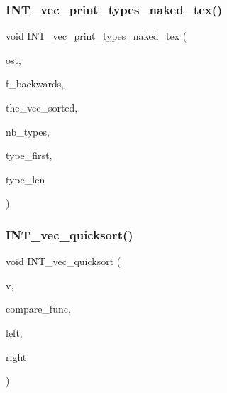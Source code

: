 \mbox{\label{sorting_8_c_a479b7e8ee55628b5b53ac38bf6532476}} 
\subsubsection{\texorpdfstring{I\+N\+T\+\_\+vec\+\_\+print\+\_\+types\+\_\+naked\+\_\+tex()}{INT\_vec\_print\_types\_naked\_tex()}}
{\footnotesize\ttfamily void I\+N\+T\+\_\+vec\+\_\+print\+\_\+types\+\_\+naked\+\_\+tex (\begin{DoxyParamCaption}\item[{ostream \&}]{ost,  }\item[{\mbox{\hyperlink{galois_8h_a09fddde158a3a20bd2dcadb609de11dc}{I\+NT}}}]{f\+\_\+backwards,  }\item[{\mbox{\hyperlink{galois_8h_a09fddde158a3a20bd2dcadb609de11dc}{I\+NT}} $\ast$}]{the\+\_\+vec\+\_\+sorted,  }\item[{\mbox{\hyperlink{galois_8h_a09fddde158a3a20bd2dcadb609de11dc}{I\+NT}}}]{nb\+\_\+types,  }\item[{\mbox{\hyperlink{galois_8h_a09fddde158a3a20bd2dcadb609de11dc}{I\+NT}} $\ast$}]{type\+\_\+first,  }\item[{\mbox{\hyperlink{galois_8h_a09fddde158a3a20bd2dcadb609de11dc}{I\+NT}} $\ast$}]{type\+\_\+len }\end{DoxyParamCaption})}

\mbox{\label{sorting_8_c_a06b413b423531ad098e9536031cc91ef}} 
\subsubsection{\texorpdfstring{I\+N\+T\+\_\+vec\+\_\+quicksort()}{INT\_vec\_quicksort()}}
{\footnotesize\ttfamily void I\+N\+T\+\_\+vec\+\_\+quicksort (\begin{DoxyParamCaption}\item[{\mbox{\hyperlink{galois_8h_a09fddde158a3a20bd2dcadb609de11dc}{I\+NT}} $\ast$}]{v,  }\item[{\mbox{\hyperlink{galois_8h_a09fddde158a3a20bd2dcadb609de11dc}{I\+NT}}($\ast$)(\mbox{\hyperlink{galois_8h_a09fddde158a3a20bd2dcadb609de11dc}{I\+NT}} a, \mbox{\hyperlink{galois_8h_a09fddde158a3a20bd2dcadb609de11dc}{I\+NT}} \mbox{\hyperlink{alphabet2_8_c_a148e3876077787926724625411d6e7a9}{b}})}]{compare\+\_\+func,  }\item[{\mbox{\hyperlink{galois_8h_a09fddde158a3a20bd2dcadb609de11dc}{I\+NT}}}]{left,  }\item[{\mbox{\hyperlink{galois_8h_a09fddde158a3a20bd2dcadb609de11dc}{I\+NT}}}]{right }\end{DoxyParamCaption})}

